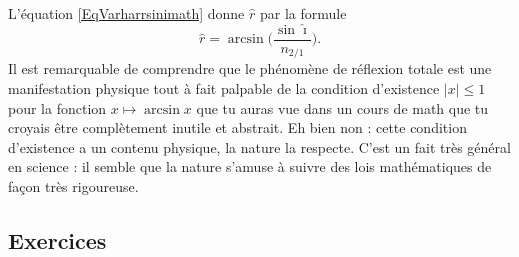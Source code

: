 L'équation \eqref{EqVarharrsinimath} donne $\hat r$ par la formule  \label{PgExpCErefrtot}
\[ 
  \hat r=\arcsin\Big( \frac{ \sin\hat\imath }{ n_{2/1} } \Big).
\]
Il est remarquable de comprendre que le phénomène de réflexion totale est une manifestation physique tout à fait palpable de la condition d'existence $| x |\leq1$ pour la fonction $x\mapsto\arcsin x$ que tu auras vue dans un cours de math que tu croyais être complètement inutile et abstrait. Eh bien non : cette condition d'existence a un contenu physique, la nature la respecte. C'est un fait très général en science : il semble que la nature s'amuse à suivre des lois mathématiques de façon très rigoureuse. 

\subsection{Exercices}

